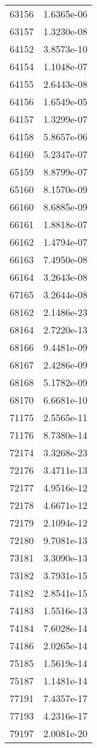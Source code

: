 \begin{table}[h!]
\begin{tabular}{|| c || c |}
63156 & 1.6365e-06 \\
63157 & 1.3230e-08 \\
64152 & 3.8573e-10 \\
64154 & 1.1048e-07 \\
64155 & 2.6443e-08 \\
64156 & 1.6549e-05 \\
64157 & 1.3299e-07 \\
64158 & 5.8657e-06 \\
64160 & 5.2347e-07 \\
65159 & 8.8799e-07 \\
65160 & 8.1570e-09 \\
66160 & 8.6885e-09 \\
66161 & 1.8818e-07 \\
66162 & 1.4794e-07 \\
66163 & 7.4950e-08 \\
66164 & 3.2643e-08 \\
67165 & 3.2644e-08 \\
68162 & 2.1486e-23 \\
68164 & 2.7220e-13 \\
68166 & 9.4481e-09 \\
68167 & 2.4286e-09 \\
68168 & 5.1782e-09 \\
68170 & 6.6681e-10 \\
71175 & 2.5565e-11 \\
71176 & 8.7380e-14 \\
72174 & 3.3268e-23 \\
72176 & 3.4711e-13 \\
72177 & 4.9516e-12 \\
72178 & 4.6671e-12 \\
72179 & 2.1094e-12 \\
72180 & 9.7081e-13 \\
73181 & 3.3090e-13 \\
73182 & 3.7931e-15 \\
74182 & 2.8541e-15 \\
74183 & 1.5516e-13 \\
74184 & 7.6028e-14 \\
74186 & 2.0265e-14 \\
75185 & 1.5619e-14 \\
75187 & 1.1481e-14 \\
77191 & 7.4357e-17 \\
77193 & 4.2316e-17 \\
79197 & 2.0081e-20 \\

\end{tabular}
\end{table}
